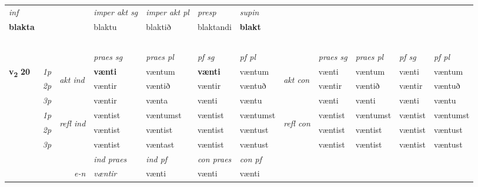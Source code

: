 \begin{longtable}[l]{X>{\footnotesize\itshape}llXXXXlXXXX}
   {\textit{inf}} & &  & \textit{imper akt sg} & \textit{imper akt pl}   & \textit{presp} & \textit{supin}   \\*
  {\textbf{blakta}} & && blaktu  & blaktið   & blaktandi &  \textbf{blakt}   \\*

\midrule
  & \\*
   & \\*
    & \\*
     & \\*
  & \\
   \midrule

 & &   & \textit{praes sg}  & \textit{praes pl}    & \textit{ pf sg} & \textit{pf pl} & & \textit{praes sg}  & \textit{praes pl}    & \textit{pf sg} & \textit{pf pl }  \\ \cmidrule{4-7} \cmidrule{9-12}
 \multirow{2}{*}{{{\textbf{v{\textsubscript{2}}} \Large{\textbf{20}}}}}  & 1p & \multirow{3}{*}{\begin{turn}{90}\textit{akt ind}\end{turn}} & \textbf{vænti} & væntum & \textbf{vænti} & væntum & \multirow{3}{*}{\begin{turn}{90}\textit{akt con}\end{turn}} &vænti & væntum & vænti & væntum\\*
 & 2p &  &  væntir  & væntið & væntir & væntuð & & væntir & væntið & væntir & væntuð \\*
 & 3p &  & væntir & vænta & vænti & væntu & & vænti & vænti& vænti & væntu \\*
\cmidrule{4-7} \cmidrule{9-12}
 & 1p & \multirow{3}{*}{\begin{turn}{90}\textit{refl ind}\end{turn}}  & væntist & væntumst & væntist & væntumst & \multirow{3}{*}{\begin{turn}{90}\textit{refl con}\end{turn}}  &væntist & væntumst & væntist & væntumst \\*
 & 2p &  & væntist & væntist & væntist & væntust & &væntist & væntist & væntist & væntust \\*
 & 3p  & & væntist & væntast & væntist & væntust & & væntist & væntist& væntist & væntust \\*
\cmidrule{4-7} \cmidrule{9-12}

   && &  \textit{ind praes} & \textit{ind pf} & \textit{con praes} & \textit{con pf} \\*
\multicolumn{3}{r}{\textit{e-n}} & væntir & vænti & vænti & vænti \\*


\end{longtable}
